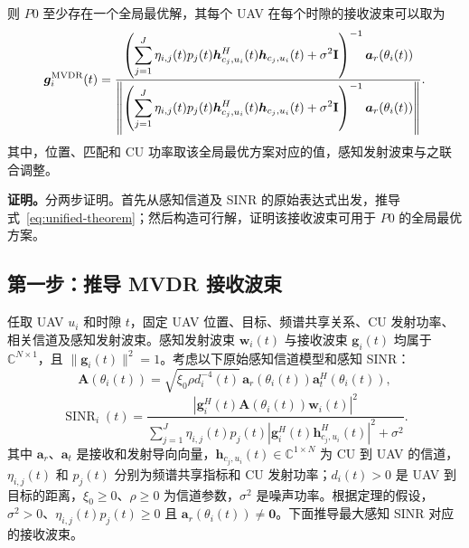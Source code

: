 \documentclass[11pt,a4paper]{ctexart}
\begin{document}
则 $P0$ 至少存在一个全局最优解，其每个 UAV 在每个时隙的接收波束可以取为
\begin{equation}\label{eq:unified-theorem}
\bm g_i^{\rm MVDR}(t)=
\frac{\left(\displaystyle\sum_{j=1}^J\eta_{i,j}(t)p_j(t)
\bm h_{c_j,u_i}^{H}(t)\bm h_{c_j,u_i}(t)+\sigma^2\mathbf I\right)^{-1}
\bm a_r(\theta_i(t))}
{\left\|\left(\displaystyle\sum_{j=1}^J\eta_{i,j}(t)p_j(t)
\bm h_{c_j,u_i}^{H}(t)\bm h_{c_j,u_i}(t)+\sigma^2\mathbf I\right)^{-1}
\bm a_r(\theta_i(t))\right\|}.
\end{equation}
其中，位置、匹配和 CU 功率取该全局最优方案对应的值，感知发射波束与之联合调整。

\medskip
\noindent\textbf{证明。}分两步证明。首先从感知信道及 SINR 的原始表达式出发，推导式~\eqref{eq:unified-theorem}；然后构造可行解，证明该接收波束可用于 $P0$ 的全局最优方案。

\subsection{第一步：推导 MVDR 接收波束}

任取 UAV $u_i$ 和时隙 $t$，固定 UAV 位置、目标、频谱共享关系、CU 发射功率、相关信道及感知发射波束。感知发射波束 $\bm w_i(t)$ 与接收波束 $\bm g_i(t)$ 均属于 $\mathbb C^{N\times1}$，且 $\|\bm g_i(t)\|^2=1$。考虑以下原始感知信道模型和感知 SINR：
\begin{equation}\label{detail:eq:channel}
\mathbf A(\theta_i(t))
=\sqrt{\xi_0\rho d_i^{-4}(t)}\,
\bm a_r(\theta_i(t))\bm a_t^H(\theta_i(t)),
\end{equation}
\begin{equation}\label{detail:eq:original-sinr}
\operatorname{SINR}_i(t)=
\frac{\left|\bm g_i^H(t)\mathbf A(\theta_i(t))\bm w_i(t)\right|^2}
{\displaystyle\sum_{j=1}^J\eta_{i,j}(t)p_j(t)
\left|\bm g_i^H(t)\bm h_{c_j,u_i}^{H}(t)\right|^2+\sigma^2}.
\end{equation}
其中 $\bm a_r$、$\bm a_t$ 是接收和发射导向向量，$\bm h_{c_j,u_i}(t)\in\mathbb C^{1\times N}$ 为 CU 到 UAV 的信道，$\eta_{i,j}(t)$ 和 $p_j(t)$ 分别为频谱共享指标和 CU 发射功率；$d_i(t)>0$ 是 UAV 到目标的距离，$\xi_0\ge0$、$\rho\ge0$ 为信道参数，$\sigma^2$ 是噪声功率。根据定理的假设，$\sigma^2>0$、$\eta_{i,j}(t)p_j(t)\ge0$ 且 $\bm a_r(\theta_i(t))\ne\bm0$。下面推导最大感知 SINR 对应的接收波束。
\end{document}
